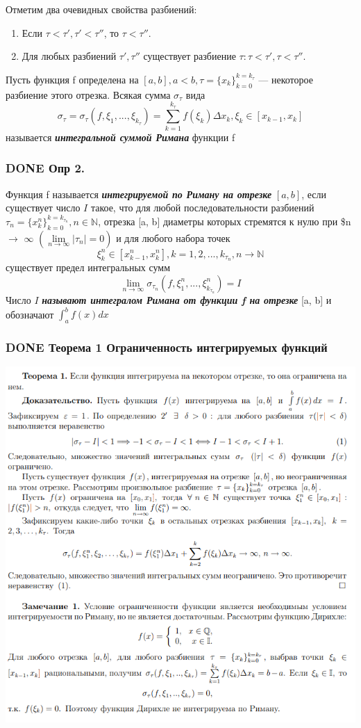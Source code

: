 \documentclass[11pt]{article}
\begin{document}
Отметим два очевидных свойства разбиений:
\begin{enumerate}
\item Если \(\tau<\tau',\tau'<\tau''\), то \(\tau<\tau''\).
\item Для любых разбиений \(\tau', \tau''\) существует разбиение \(\tau : \tau < \tau', \tau < \tau''\).
\end{enumerate}
Пусть функция f определена на \([a, b], a < b, \tau = \{x_k\}_{k=0}^{k=k_\tau}\) — некоторое разбиение
этого отрезка. Всякая сумма \(\sigma_\tau\) вида
$$
\sigma_\tau = \sigma_\tau(f,\xi_1,...,\xi_{k_\tau})=\sum_{k=1}^{k_\tau}f(\xi_{k})\Delta x_k, \xi_k\in[x_{k-1},x_k]
$$
называется \textbf{\emph{интегральной суммой Римана}} функции f

\subsubsection{{\bfseries\sffamily DONE} Опр 2.}
\label{sec:org7bbfdaf}
Функция f называется \textbf{\emph{интегрируемой по Риману на отрезке}}
 \([a, b]\), если существует число \(I\) такое, что для любой последовательности разбиений
 \(\tau_n = \{x_k^n\}_{k=0}^{k=k_{\tau_n}}, n\in \mathbb{N}\), отрезка [a, b] диаметры которых стремятся к нулю при \$n\(\to\) \(\infty\) \((\lim\limits_{n\to\infty}|\tau_n|=0)\) и для любого набора точек
$$
\xi_k^n\in[x_{k-1}^n, x_k^n], k=1,2,...,k_{\tau_n}, n\to\mathbb{N}
$$
 существует предел интегральных сумм
$$
\lim\limits_{n\to\infty}\sigma_{\tau_n}(f,\xi_1^n,...,\xi_{k_{\tau_n}}^n) = I
$$
 Число \(I\) \textbf{\emph{называют интегралом Римана от функции f на отрезке}} [a, b] и обозначают \(\int_a^bf(x)dx\)

\subsubsection{{\bfseries\sffamily DONE} Теорема 1 Ограниченность интегрируемых функций}
\label{sec:org1927411}
\begin{center}
\includegraphics[width=.9\linewidth]{img/b2-t1.png}
\end{center}
\end{document}
